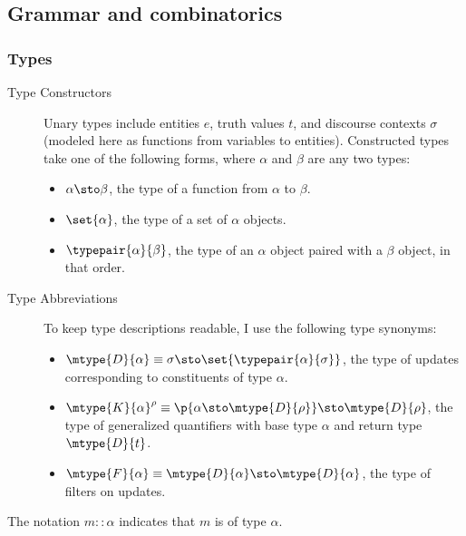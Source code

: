 \documentclass{article}
\begin{document}
\subsection{Grammar and combinatorics}
\label{app:grammar_and_combinatorics}

\subsubsection{Types}
\label{app:types}

\begin{description}
  \item[Type Constructors]
    Unary types include entities $e$, truth values $t$, and discourse contexts
    $\sigma$ (modeled here as functions from variables to entities).
    Constructed types take one of the following forms, where $\alpha$ and
    $\beta$ are any two types:
    \begin{itemize}[topsep=0pt,leftmargin=*]
      \item $\alpha \sto \beta$, the type of a function from $\alpha$ to $\beta$.
      \item $\set{\alpha}$, the type of a set of $\alpha$ objects.
      \item $\typepair{\alpha}{\beta}$, the type of an $\alpha$ object paired with
        a $\beta$ object, in that order.
    \end{itemize}
  \item[Type Abbreviations]
    To keep type descriptions readable, I use the following type synonyms:
    \begin{itemize}[topsep=0pt,leftmargin=*]
      \item
        $\mtype{D}{\alpha} \equiv \sigma\sto \set{\typepair{\alpha}{\sigma}}$,
        the type of updates corresponding to constituents of type $\alpha$.
      \item
        $\mtype{K}{\alpha}^{\rho} \equiv \p{\alpha\sto \mtype{D}{\rho}}\sto
        \mtype{D}{\rho}$, the type of generalized quantifiers with base type
        $\alpha$ and return type $\mtype{D}{t}$.
      \item
        $\mtype{F}{\alpha} \equiv \mtype{D}{\alpha}\sto \mtype{D}{\alpha}$,
        the type of filters on updates.
    \end{itemize}
\end{description}

\noindent
The notation $m :: \alpha$ indicates that $m$ is of type $\alpha$.
\end{document}
